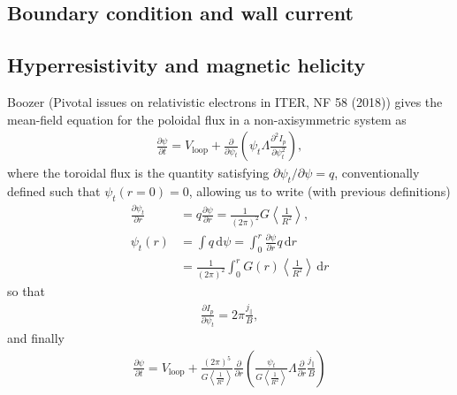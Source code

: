 \documentclass[11pt,a4paper]{article}
\newcommand{\rd}{\ensuremath{\mathrm{d}}}
\newcommand{\sub}[1]{\ensuremath{_{\text{#1}}}}
\renewcommand{\b}[1]{\ensuremath{ {\bf #1 } }}
\begin{document}
\subsection{Boundary condition and wall current}

\subsection{Hyperresistivity and magnetic helicity}
Boozer (Pivotal issues on relativistic electrons in ITER, NF 58 (2018)) gives the mean-field equation for the poloidal flux in a non-axisymmetric system as
\begin{align}
\frac{\partial \psi}{\partial t} = V\sub{loop} + \frac{\partial}{\partial \psi_t}\left(\psi_t \Lambda \frac{\partial^2 I_p}{\partial \psi_t^2}\right),
\end{align}
where the toroidal flux is the quantity satisfying $\partial \psi_t/\partial \psi = q$, conventionally defined such that $\psi_t(r=0) = 0$, allowing us to write (with previous definitions) 
\begin{align}
\frac{\partial \psi_t}{\partial r} &= q\frac{\partial \psi}{\partial r} = \frac{1}{(2\pi)^2}G\left\langle\frac{1}{R^2}\right\rangle, \nonumber \\
\psi_t(r) &= \int q \,\rd \psi = \int_0^r \frac{\partial \psi}{\partial r}q\,\rd r \nonumber \\
&= \frac{1}{(2\pi)^2} \int_0^r G(r) \left\langle\frac{1}{R^2}\right\rangle \,\rd r
\end{align}
so that
\begin{align}
\frac{\partial I_p}{\partial \psi_t} = 2\pi \frac{j_\parallel}{B},
\end{align}
and finally 
\begin{align}
\frac{\partial \psi}{\partial t} = V\sub{loop} + \frac{(2\pi)^5}{G\left\langle\frac{1}{R^2}\right\rangle}\frac{\partial}{\partial r}\left(\frac{\psi_t}{G\left\langle\frac{1}{R^2}\right\rangle}\Lambda \frac{\partial}{\partial r}\frac{j_\parallel}{B}\right)
\end{align}

\end{document}
